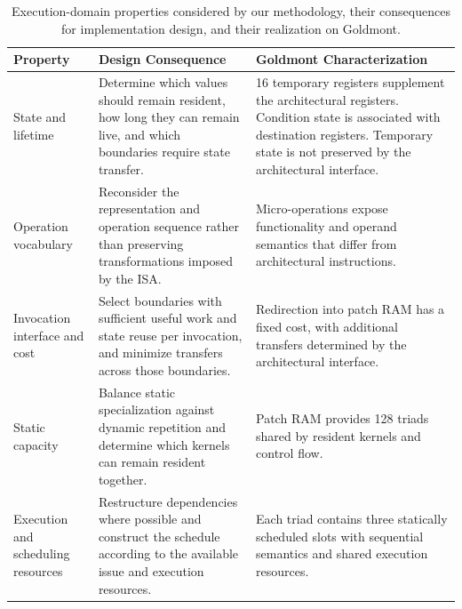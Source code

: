 \documentclass[journal=tches,submission]{iacrtrans}
\begin{document}
\begin{table}[!ht]
    \centering
  \caption{Execution-domain properties considered by our methodology, their consequences for implementation design, and their realization on Goldmont.}
  \label{tab:methodology}
  \footnotesize
  \begin{tabularx}{\textwidth}{@{}p{}p{}X@{}}
    \toprule 
    \textbf{Property} & 
    \textbf{Design Consequence} & 
    \textbf{Goldmont Characterization} \\ 
    \midrule 
    
    State and lifetime & 
    Determine which values should remain resident, how long they can remain live, and which boundaries require state transfer. & 
    16 temporary registers supplement the architectural registers. 
    Condition state is associated with destination registers. 
    Temporary state is not preserved by the architectural interface. \\ 
    
    Operation vocabulary & 
    Reconsider the representation and operation sequence rather than preserving transformations imposed by the ISA. & 
    Micro-operations expose functionality and operand semantics that differ from architectural instructions. \\ 
    
    Invocation interface and cost & 
    Select boundaries with sufficient useful work and state reuse per invocation, and minimize transfers across those boundaries. & 
    Redirection into patch RAM has a fixed cost, with additional transfers determined by the architectural interface. \\ 
    
    Static capacity & 
    Balance static specialization against dynamic repetition and determine which kernels can remain resident together. & 
    Patch RAM provides 128 triads shared by resident kernels and control flow. \\ 
    
    Execution and scheduling resources & 
    Restructure dependencies where possible and construct the schedule according to the available issue and execution resources. & 
    Each triad contains three statically scheduled slots with sequential semantics and shared execution resources. \\ 
    \bottomrule 
  \end{tabularx} 
  \label{tab:methodology}
\end{table}
\end{document}
